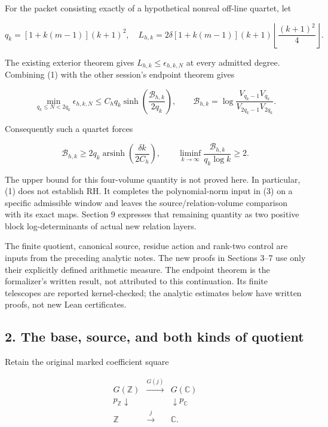 \documentclass[11pt,a4paper]{article}
\begin{document}
For the packet consisting exactly of a hypothetical nonreal off-line quartet, let

\[
 q_k=[1+k(m-1)](k+1)^2,
 \quad
 L_{h,k}=2\delta[1+k(m-1)](k+1)
                 \left\lfloor\frac{(k+1)^2}{4}\right\rfloor.             \tag{2}
\]

The existing exterior theorem gives \(L_{h,k}\le\epsilon_{h,k,N}\) at every admitted degree. Combining (1) with the other session's endpoint theorem gives

\[
 \boxed{\min_{q_k\le N<2q_k}\epsilon_{h,k,N}
 \le C_hq_k\sinh\!\left(\frac{\mathcal B_{h,k}}{2q_k}\right),\qquad
 \mathcal B_{h,k}=\log\frac{V_{q_k-1}V_{q_k}}
                              {V_{2q_k-1}V_{2q_k}}.}                    \tag{3}
\]

Consequently such a quartet forces

\[
 \boxed{\mathcal B_{h,k}\ge
 2q_k\operatorname{arsinh}\!\left(\frac{\delta k}{2C_h}\right),\qquad
 \liminf_{k\to\infty}\frac{\mathcal B_{h,k}}{q_k\log k}\ge2.}           \tag{4}
\]

The upper bound for this four-volume quantity is not proved here. In particular, (1) does not establish RH. It completes the polynomial-norm input in (3) on a specific admissible window and leaves the source/relation-volume comparison with its exact maps. Section 9 expresses that remaining quantity as two positive block log-determinants of actual new relation layers.

The finite quotient, canonical source, residue action and rank-two control are inputs from the preceding analytic notes. The new proofs in Sections 3--7 use only their explicitly defined arithmetic measure. The endpoint theorem is the formalizer's written result, not attributed to this continuation. Its finite telescopes are reported kernel-checked; the analytic estimates below have written proofs, not new Lean certificates.

\subsection{2. The base, source, and both kinds of quotient}\label{zlm:endpoint-arithmetic_original--the-base-source-and-both-kinds-of-quotient}

Retain the original marked coefficient square

\[
\begin{array}{ccc}
 G(\mathbb Z)&\xrightarrow{G(j)}&G(\mathbb C)\\
 p_{\mathbb Z}\downarrow&&\downarrow p_{\mathbb C}\\
 \mathbb Z&\xrightarrow{j}&\mathbb C.
\end{array}                                                          \tag{5}
\]
\end{document}
